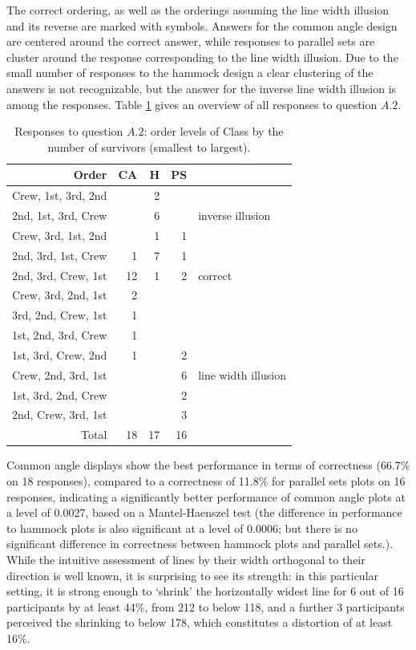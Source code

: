 The correct ordering, as well as the orderings assuming the line width illusion and its reverse are marked with symbols. Answers for the common angle design are centered around the correct answer, while responses to parallel sets are cluster around the response corresponding to the line width illusion. Due to the small number of responses to the hammock design a clear clustering of the answers is not recognizable, but the answer for the inverse line width illusion is among the responses. Table \ref{a2} gives an overview of all responses to question $A.2$. 

\begin{table}[ht]
\begin{center}
\begin{tabular}{rrrrl}
Order  & CA & H & PS\\
  \hline
  Crew, 1st, 3rd, 2nd &  &  2 &  \\ 
  2nd, 1st, 3rd, Crew &  &  6 &  & inverse illusion \\ 
   Crew, 3rd, 1st, 2nd &  &  1 &  1 \\ 
  2nd, 3rd, 1st, Crew & 1 & 7 & 1 \\ 
  2nd, 3rd, Crew, 1st & 12 &  1 &  2 & correct\\ 
  Crew, 3rd, 2nd, 1st &  2 &  &  \\ 
  3rd, 2nd, Crew, 1st &  1 &  &  \\ 
  1st, 2nd, 3rd, Crew &  1 &  &   \\ 
  1st, 3rd, Crew, 2nd &  1 &  &  2 \\ 
  Crew, 2nd, 3rd, 1st &  &  & 6 &  line width illusion\\  
  1st, 3rd, 2nd, Crew &  &  &  2 \\ 
  2nd, Crew, 3rd, 1st &  &  &  3 \\ 
   \hline
  Total & 18 & 17 & 16 \\ 
   \hline
\end{tabular}
\end{center}
\caption{\label{a2} Responses to question $A.2$: order levels of Class by the number of survivors (smallest to largest). }
\end{table}

%
Common angle displays show the best performance in terms of correctness (66.7\% on 18 responses), compared to a correctness of 11.8\% for parallel sets plots on 16 responses, indicating a significantly better performance of common angle plots at a level of 0.0027, based on a Mantel-Haenszel test (the difference in performance to hammock plots is also significant at a level of 0.0006; but there is no significant difference in correctness between hammock plots and parallel sets.).
While the intuitive assessment of lines by their width orthogonal to their direction is well known, it is surprising to see its strength: in this particular setting, it is strong enough to `shrink' the horizontally widest line for 6 out of 16 participants by at least  44\%, from 212 to below 118, and a further 3 participants perceived the shrinking to below 178, which constitutes a distortion of at least 16\%.

